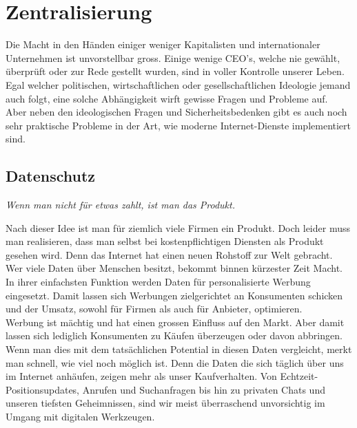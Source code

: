 \documentclass[a4paper,11pt,titlepage,twoside]{memoir}
\begin{document}
\section{Zentralisierung}
\label{sec:orgd35e4cc}
\noindent Die Macht in den Händen einiger weniger Kapitalisten und
internationaler Unternehmen ist unvorstellbar gross. Einige wenige
CEO's, welche nie gewählt, überprüft oder zur Rede gestellt wurden,
sind in voller Kontrolle unserer Leben. Egal welcher politischen,
wirtschaftlichen oder gesellschaftlichen Ideologie jemand auch folgt,
eine solche Abhängigkeit wirft gewisse Fragen und Probleme auf.\\

\noindent Aber neben den ideologischen Fragen und Sicherheitsbedenken
gibt es auch noch sehr praktische Probleme in der Art, wie moderne
Internet-Dienste implementiert sind.
\subsection{Datenschutz}
\label{sec:orge033734}
\begin{center}
\emph{Wenn man nicht für etwas zahlt, ist man das Produkt.}
\end{center}
Nach dieser Idee ist man für ziemlich viele Firmen ein Produkt. Doch
leider muss man realisieren, dass man selbst bei kostenpflichtigen
Diensten als Produkt gesehen wird. Denn das Internet hat einen neuen
Rohstoff zur Welt gebracht. Wer viele Daten über Menschen besitzt,
bekommt binnen kürzester Zeit Macht.\\

\noindent In ihrer einfachsten Funktion werden Daten für
personalisierte Werbung eingesetzt. Damit lassen sich Werbungen
zielgerichtet an Konsumenten schicken und der Umsatz, sowohl für
Firmen als auch für Anbieter, optimieren.\\

\noindent Werbung ist mächtig und hat einen grossen Einfluss auf den
Markt. Aber damit lassen sich lediglich Konsumenten zu Käufen
überzeugen oder davon abbringen. Wenn man dies mit dem tatsächlichen
Potential in diesen Daten vergleicht, merkt man schnell, wie viel noch
möglich ist. Denn die Daten die sich täglich über uns im Internet
anhäufen, zeigen mehr als unser Kaufverhalten. Von
Echtzeit-Positionsupdates, Anrufen und Suchanfragen bis hin zu privaten
Chats und unseren tiefsten Geheimnissen, sind wir meist überraschend
unvorsichtig im Umgang mit digitalen Werkzeugen.\\
\end{document}
